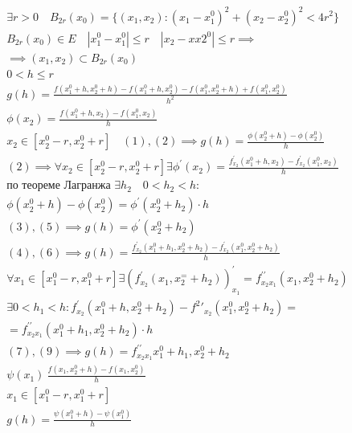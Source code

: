 \documentclass[main]{subfiles}
\begin{document}
        \begin{longProof}
            \begin{gather*}
                \exists r > 0 \quad B_{2r}(x_0) = \{ (x_1,x_2) : (x_1-x_1^0)^2 + (x_2-x_2^0)^2 < 4r^2 \} \\
                B_{2r}(x_0) \in E \quad |x_1^0 - x_1^0| \leq r \quad |x_2-xx2^0| \leq r \implies \\
                \implies (x_1,x_2) \subset B_{2r}(x_0) \\
                0 < h \leq r \\
                g(h) = \frac{f(x_1^0+h,x_2^0+h)-f(x_1^0+h,x_2^0) - f(x_1^0,x_2^0+h) + f(x_1^0,x_2^0)}{h^2} \tag{1}\\
                \phi(x_2) = \frac{f(x_1^0+h,x_2) - f(x_1^0,x_2)}{h} \tag{2}\\
                x_2 \in [x_2^0-r, x_2^0+r]  \quad (1),(2) \implies g(h) = \frac{\phi(x_2^0+h)-\phi(x_2^0)}{h} \tag{3} \\
                (2) \implies \forall x_2 \in [x^0_2 - r, x^0_2 + r] \exists \phi^\prime(x_2) = \frac{f^\prime_{x_2}(x_1^0+h,x_2)-f^\prime_{x_2}(x_1^0,x_2)}{h} \tag{4}\\
                \text{по теореме Лагранжа } \exists h_2 \quad 0 < h_2 < h : \\
                \phi(x_2^0+h) - \phi(x_2^0) = \phi^\prime(x_2^0+h_2) \cdot h \tag{5}\\
                (3),(5) \implies g(h) = \phi^\prime(x_2^0 + h_2) \tag{6}\\
                (4),(6) \implies g(h) = \frac{f^\prime_{x_2}(x_1^0+h_1,x_2^0+h_2)-f^\prime_{x_2}(x_1^0,x^0_2 + h_2)}{h} \tag{7}\\
                \forall x_1 \in [x_1^0-r,x_1^0+r] \exists (f^\prime_{x_2}(x_1,x_2^=+h_2))^\prime_{x_1} = f^{\prime\prime}_{x_2x_1}(x_1,x_2^0+h_2) \tag{8}\\
                \exists 0 < h_1 < h : f^\prime_{x_2}(x_1^0+h,x_2^0+h_2) - f^2\prime_{x_2}(x_1^0,x_2^0+h_2) =\\=
                f^{\prime\prime}_{x_2x_1}(x_1^0 + h_1, x_2^0 + h_2) \cdot h \tag{9}\\
                (7),(9) \implies g(h) = f^{\prime\prime}_{x_2x_1}{x_1^0+h_1,x_2^0 + h_2} \tag{10}\\
                \psi(x_1) \ \frac{f(x_1,x_2^0+h)-f(x_1,x_2^0)}{h} \tag{11}\\
                x_1 \in [x_1^0-r,x_1^0+r] \\
                g(h) = \frac{\psi(x^0_1+h)-\psi(x_1^0)}{h} \tag{12}\\

\end{gather*}
\end{longProof}
\end{document}
